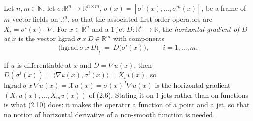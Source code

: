 \begin{definition}
Let $n,m\in\mathbb N$, let
$\sigma:\mathbb R^n\to\mathbb R^{n\times m}$, $\sigma(x)=[\sigma^1(x),\ldots,\sigma^m(x)]$,
be a frame of $m$ vector fields on $\mathbb R^n$, so that the associated first-order
operators are $X_i=\sigma^i(x)\cdot\nabla$. For $x\in\mathbb R^n$ and a $1$-jet
$D:\mathbb R^n\to\mathbb R$, the \emph{horizontal gradient of $D$ at $x$} is the vector
$\mathrm{hgrad}\ \sigma\ x\ D\in\mathbb R^m$ with components
\[
 \big(\mathrm{hgrad}\ \sigma\ x\ D\big)_i\ =\ D\big(\sigma^i(x)\big),
 \qquad i=1,\ldots,m .
\]

If $u$ is differentiable at $x$ and $D=\nabla u(x)$, then
$D(\sigma^i(x))=\langle\nabla u(x),\sigma^i(x)\rangle=X_iu(x)$, so
$\mathrm{hgrad}\ \sigma\ x\ \nabla u(x)=\mathcal Xu(x)=\sigma(x)^T\nabla u(x)$ is the
horizontal gradient $(X_1u(x),\ldots,X_mu(x))$ of (2.6). Stating it on $1$-jets rather
than on functions is what (2.10) does: it makes the operator a function of a point and a
jet, so that no notion of horizontal derivative of a non-smooth function is needed.
\end{definition}
